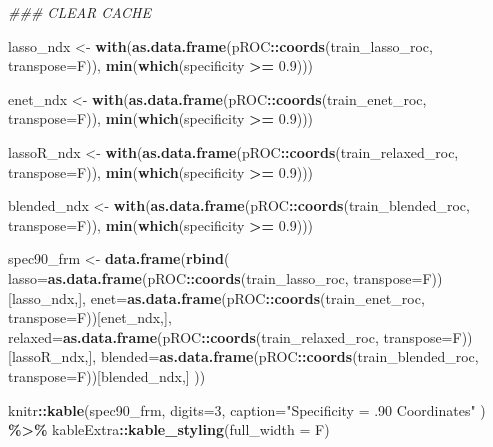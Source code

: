 \documentclass[
]{book}
\newenvironment{Shaded}{\begin{snugshade}}{\end{snugshade}}
\newcommand{\CommentTok}[1]{\textcolor[rgb]{0.56,0.35,0.01}{\textit{#1}}}
\newcommand{\DataTypeTok}[1]{\textcolor[rgb]{0.13,0.29,0.53}{#1}}
\newcommand{\DecValTok}[1]{\textcolor[rgb]{0.00,0.00,0.81}{#1}}
\newcommand{\FloatTok}[1]{\textcolor[rgb]{0.00,0.00,0.81}{#1}}
\newcommand{\KeywordTok}[1]{\textcolor[rgb]{0.13,0.29,0.53}{\textbf{#1}}}
\newcommand{\NormalTok}[1]{#1}
\newcommand{\OperatorTok}[1]{\textcolor[rgb]{0.81,0.36,0.00}{\textbf{#1}}}
\newcommand{\StringTok}[1]{\textcolor[rgb]{0.31,0.60,0.02}{#1}}
\begin{document}
\begin{Shaded}
\begin{Highlighting}[]
\CommentTok{\#\#\# CLEAR CACHE}

\NormalTok{ lasso\_ndx <{-}}\StringTok{ }\KeywordTok{with}\NormalTok{(}\KeywordTok{as.data.frame}\NormalTok{(pROC}\OperatorTok{::}\KeywordTok{coords}\NormalTok{(train\_lasso\_roc, }\DataTypeTok{transpose=}\NormalTok{F)), }
   \KeywordTok{min}\NormalTok{(}\KeywordTok{which}\NormalTok{(specificity }\OperatorTok{>=}\StringTok{ }\FloatTok{0.9}\NormalTok{)))}

\NormalTok{ enet\_ndx <{-}}\StringTok{ }\KeywordTok{with}\NormalTok{(}\KeywordTok{as.data.frame}\NormalTok{(pROC}\OperatorTok{::}\KeywordTok{coords}\NormalTok{(train\_enet\_roc, }\DataTypeTok{transpose=}\NormalTok{F)), }
   \KeywordTok{min}\NormalTok{(}\KeywordTok{which}\NormalTok{(specificity }\OperatorTok{>=}\StringTok{ }\FloatTok{0.9}\NormalTok{)))}

\NormalTok{ lassoR\_ndx <{-}}\StringTok{ }\KeywordTok{with}\NormalTok{(}\KeywordTok{as.data.frame}\NormalTok{(pROC}\OperatorTok{::}\KeywordTok{coords}\NormalTok{(train\_relaxed\_roc, }\DataTypeTok{transpose=}\NormalTok{F)), }
   \KeywordTok{min}\NormalTok{(}\KeywordTok{which}\NormalTok{(specificity }\OperatorTok{>=}\StringTok{ }\FloatTok{0.9}\NormalTok{)))}

\NormalTok{ blended\_ndx <{-}}\StringTok{ }\KeywordTok{with}\NormalTok{(}\KeywordTok{as.data.frame}\NormalTok{(pROC}\OperatorTok{::}\KeywordTok{coords}\NormalTok{(train\_blended\_roc, }\DataTypeTok{transpose=}\NormalTok{F)), }
   \KeywordTok{min}\NormalTok{(}\KeywordTok{which}\NormalTok{(specificity }\OperatorTok{>=}\StringTok{ }\FloatTok{0.9}\NormalTok{)))}

\NormalTok{  spec90\_frm <{-}}\StringTok{ }\KeywordTok{data.frame}\NormalTok{(}\KeywordTok{rbind}\NormalTok{(}
  \DataTypeTok{lasso=}\KeywordTok{as.data.frame}\NormalTok{(pROC}\OperatorTok{::}\KeywordTok{coords}\NormalTok{(train\_lasso\_roc, }\DataTypeTok{transpose=}\NormalTok{F))[lasso\_ndx,],}
  \DataTypeTok{enet=}\KeywordTok{as.data.frame}\NormalTok{(pROC}\OperatorTok{::}\KeywordTok{coords}\NormalTok{(train\_enet\_roc, }\DataTypeTok{transpose=}\NormalTok{F))[enet\_ndx,],}
  \DataTypeTok{relaxed=}\KeywordTok{as.data.frame}\NormalTok{(pROC}\OperatorTok{::}\KeywordTok{coords}\NormalTok{(train\_relaxed\_roc, }\DataTypeTok{transpose=}\NormalTok{F))[lassoR\_ndx,],}
  \DataTypeTok{blended=}\KeywordTok{as.data.frame}\NormalTok{(pROC}\OperatorTok{::}\KeywordTok{coords}\NormalTok{(train\_blended\_roc, }\DataTypeTok{transpose=}\NormalTok{F))[blended\_ndx,]}
\NormalTok{ ))}


\NormalTok{knitr}\OperatorTok{::}\KeywordTok{kable}\NormalTok{(spec90\_frm,}
  \DataTypeTok{digits=}\DecValTok{3}\NormalTok{,}
  \DataTypeTok{caption=}\StringTok{"Specificity = .90 Coordinates"}
\NormalTok{) }\OperatorTok{\%>\%}
\StringTok{  }\NormalTok{kableExtra}\OperatorTok{::}\KeywordTok{kable\_styling}\NormalTok{(}\DataTypeTok{full\_width =}\NormalTok{ F)}
\end{Highlighting}
\end{Shaded}
\end{document}
